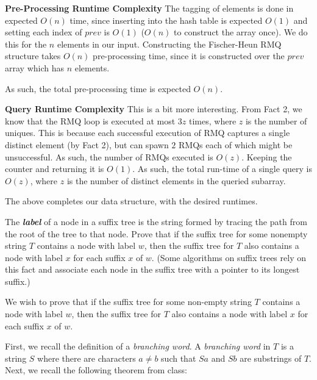 \documentclass[12pt]{exam}
\newcommand{\Q}[1]{\question{\large{\textbf{#1}}}}
\newcommand*{\bigo}[1]{O \left( #1 \right)}
\begin{document}
\begin{questions}
\begin{solution}
\textbf{Pre-Processing Runtime Complexity}
The tagging of elements is done in expected $\bigo{n}$ time, since inserting into the hash table is expected $\bigo{1}$ and setting each index of $prev$ is $\bigo{1}$ ($\bigo{n}$ to construct the array once). We do this for the $n$ elements in our input. Constructing the Fischer-Heun RMQ structure takes $\bigo{n}$ pre-processing time, since it is constructed over the $prev$ array which has $n$ elements.

As such, the total pre-processing time is expected $\bigo{n}$.


\textbf{Query Runtime Complexity}
This is a bit more interesting. From Fact 2, we know that the RMQ loop is executed at most $3z$ times, where $z$ is the number of uniques. This is because each successful execution of RMQ captures a single distinct element (by Fact 2), but can spawn $2$ RMQs each of which might be unsuccessful. As such, the number of RMQs executed is $\bigo{z}$. Keeping the counter and returning it is $\bigo{1}$. As such, the total run-time of a single query is $\bigo{z}$, where $z$ is the number of distinct elements in the queried subarray.


The above completes our data structure, with the desired runtimes.

\end{solution}

\newpage
\Q{Problem Two: String Data Structures}

The \textit{\textbf{label}} of a node in a suffix tree is the string formed by tracing the path from the root of the tree to that node. Prove that if the suffix tree for some nonempty string $T$ contains a node with label $w$, then the suffix tree for $T$ also contains a node with label $x$ for each suffix $x$ of $w$. (Some algorithms on suffix trees rely on this fact and associate each node in the suffix tree with a pointer to its longest suffix.)

\begin{solution}
We wish to prove that if the suffix tree for some non-empty string $T$ contains a node with label $w$, then the suffix tree for $T$ also contains a node with label $x$ for each suffix $x$ of $w$.


First, we recall the definition of a \textit{branching word}. A \textit{branching word} in $T$ is a string $S$ where there are characters $a \neq b$ such that $Sa$ and $Sb$ are substrings of $T$. Next, we recall the following theorem from class:


\end{solution}
\end{questions}
\end{document}
